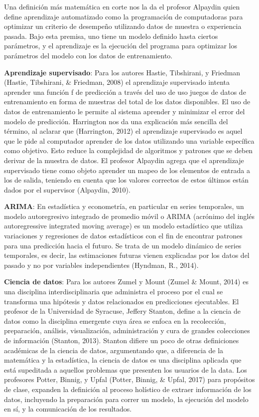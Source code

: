 Una definición más matemática en corte nos la da el profesor Alpaydin \cite{alpaydin} quien define aprendizaje automatizado como la programación de computadoras para optimizar un criterio de desempeño utilizando datos de muestra o experiencia pasada. Bajo esta premisa, uno tiene un modelo definido hasta ciertos parámetros, y el aprendizaje es la ejecución del programa para optimizar los parámetros del modelo con los datos de entrenamiento.
 
\textbf{Aprendizaje supervisado}: Para los autores Hastie, Tibshirani, y Friedman (Hastie, Tibshirani, \& Friedman, 2008) el aprendizaje supervisado intenta aprender una función f de predicción a través del uso de uso juegos de datos de entrenamiento en forma de muestras del total de los datos disponibles. El uso de datos de entrenamiento le permite al sistema aprender y minimizar el error del modelo de predicción. Harrington nos da una explicación más sencilla del término, al aclarar que (Harrington, 2012) el aprendizaje supervisado es aquel que le pide al computador aprender de los datos utilizando una variable específica como objetivo. Esto reduce la complejidad de algoritmos y patrones que se deben derivar de la muestra de datos. El profesor Alpaydin agrega que el aprendizaje supervisado tiene como objeto aprender un mapeo de los elementos de entrada a los de salida, teniendo en cuenta que los valores correctos de estos últimos están dados por el supervisor (Alpaydin, 2010).
 
\textbf{ARIMA}: En estadística y econometría, en particular en series temporales, un modelo autoregresivo integrado de promedio móvil o ARIMA (acrónimo del inglés autoregressive integrated moving average) es un modelo estadístico que utiliza variaciones y regresiones de datos estadísticos con el fin de encontrar patrones para una predicción hacia el futuro. Se trata de un modelo dinámico de series temporales, es decir, las estimaciones futuras vienen explicadas por los datos del pasado y no por variables independientes (Hyndman, R., 2014).

\textbf{Ciencia de datos}: Para los autores Zumel y Mount (Zumel \& Mount, 2014) es una disciplina interdisciplinaria que administra el proceso por el cual se transforma una hipótesis y datos relacionados en predicciones ejecutables. El profesor de la Universidad de Syracuse, Jeffery Stanton, define a la ciencia de datos como la disciplina emergente cuya área se enfoca en la recolección, preparación, análisis, visualización, administración y cura de grandes colecciones de información (Stanton, 2013). Stanton difiere un poco de otras definiciones académicas de la ciencia de datos, argumentando que, a diferencia de la matemática y la estadística, la ciencia de datos es una disciplina aplicada que está supeditada a aquellos problemas que presenten los usuarios de la data. Los profesores Potter, Binnig, y Upfal (Potter, Binnig, \& Upfal, 2017) para propósitos de clase, expanden la definición al proceso holístico de extraer información de los datos, incluyendo la preparación para correr un modelo, la ejecución del modelo en sí, y la comunicación de los resultados.
 
